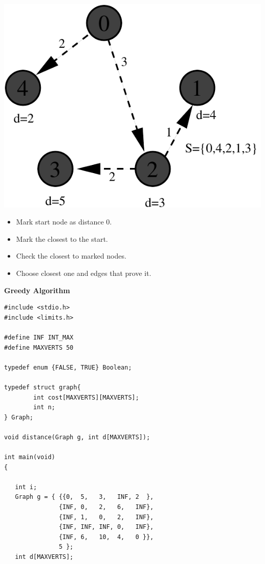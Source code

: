 \documentclass[a4,portraitt]{slides}
\begin{document}
{{\begin{center}
\includegraphics{../Images/graphf.pdf}
\end{center}

\begin{itemize}
\item Mark start node as distance 0.
\item Mark the closest to the start.
\item Check the closest to marked nodes.
\item Choose closest one and edges that prove it.
\end{itemize}
}

\newpage
{\samepage
\begin{center}
{\Large{\bf Greedy Algorithm}}
\end{center}
{\small
\begin{verbatim}
#include <stdio.h>
#include <limits.h>

#define INF INT_MAX
#define MAXVERTS 50

typedef enum {FALSE, TRUE} Boolean;

typedef struct graph{
        int cost[MAXVERTS][MAXVERTS];
        int n;
} Graph;

void distance(Graph g, int d[MAXVERTS]);

int main(void)
{

   int i;
   Graph g = { {{0,  5,   3,   INF, 2  },
               {INF, 0,   2,   6,   INF},
               {INF, 1,   0,   2,   INF},
               {INF, INF, INF, 0,   INF},
               {INF, 6,   10,  4,   0 }},
               5 };
   int d[MAXVERTS];


\end{verbatim}}}}
\end{document}

